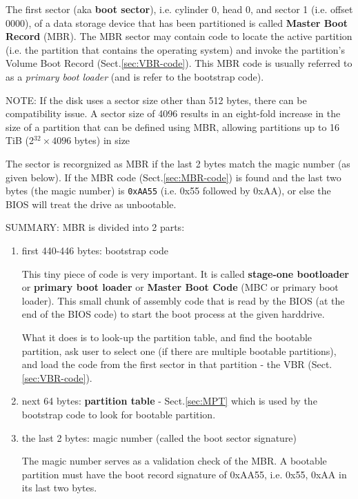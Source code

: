 The first sector (aka {\bf boot sector}), i.e. cylinder 0, head 0, and sector 1
(i.e. offset 0000),  of a data storage device that has been partitioned is
called {\bf Master Boot Record} (MBR). The MBR sector may contain code to locate
the active partition (i.e. the partition that contains the operating system) and
invoke the partition's Volume Boot Record (Sect.\ref{sec:VBR-code}). This MBR
code is usually referred to as a {\it primary boot loader} (and is refer to the
bootstrap code).


NOTE: If the disk uses a sector size other than 512 bytes, there can be
compatibility issue. A sector size of 4096 results in an eight-fold increase in
the size of a partition that can be defined using MBR, allowing partitions up to
16 TiB (2$^{32} \times 4096$ bytes) in size

The sector is recorgnized as MBR if the last 2 bytes match the magic number (as
given below). If the MBR code (Sect.\ref{sec:MBR-code}) is found and the last
two   bytes (the magic number) is \verb!0xAA55! (i.e. 0x55 followed by 0xAA), or
else the BIOS will treat the drive as unbootable.

SUMMARY: MBR is divided into 2 parts:
\begin{enumerate}
  
  \item first 440-446 bytes: bootstrap code
  
This tiny piece of code is very important. It is called {\bf stage-one
bootloader} or  {\bf primary boot loader} or  {\bf Master Boot Code} (MBC or
primary boot loader). This small  chunk of assembly code that is read by the
BIOS (at the end of the BIOS code) to start the boot process at the given
harddrive. 

What it does is to look-up the partition table, and find the bootable partition,
ask user to select one (if there are multiple bootable partitions), and load the
code from the first sector in that partition - the VBR
(Sect.\ref{sec:VBR-code}).
    
  \item next 64 bytes: {\bf partition table} - Sect.\ref{sec:MPT} which is used
  by the bootstrap code to look for bootable partition.
  
  \item the last 2 bytes: magic number (called the boot sector signature) 
  
    The magic number serves as a validation check of the MBR.
    A bootable partition must have the boot record signature of 
    0xAA55, i.e. 0x55, 0xAA in its last two bytes.
    
\end{enumerate}


